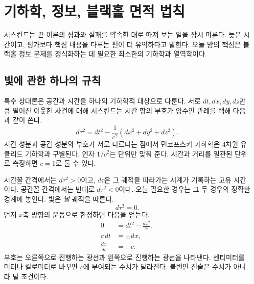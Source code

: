\chapter{기하학, 정보, 블랙홀 면적 법칙}


서스킨드는 끈 이론의 성과와 실패를 약속한 대로 따져 보는 일을 잠시 미룬다. 늦은 시간이고, 평가보다 핵심 내용을 다루는 편이 더 유익하다고 말한다. 오늘 밤의 핵심은 블랙홀 정보 문제를 정식화하는 데 필요한 최소한의 기하학과 열역학이다.

\section{빛에 관한 하나의 규칙}

특수 상대론은 공간과 시간을 하나의 기하학적 대상으로 다룬다. 서로 \(dt,dx,dy,dz\)만큼 떨어진 이웃한 사건에 대해 서스킨드는 시간 항의 부호가 양수인 관례를 택해 다음과 같이 쓴다.
\begin{equation}
d\tau^2=dt^2-\frac{1}{c^2}\left(dx^2+dy^2+dz^2\right).
\end{equation}
시간 성분과 공간 성분의 부호가 서로 다르다는 점에서 민코프스키 기하학은 4차원 유클리드 기하학과 구별된다. 인자 \(1/c^2\)는 단위만 맞춰 준다. 시간과 거리를 일관된 단위로 측정하면 \(c=1\)로 둘 수 있다.

시간꼴 간격에서는 \(d\tau^2>0\)이고, \(d\tau\)은 그 궤적을 따라가는 시계가 기록하는 고유 시간이다. 공간꼴 간격에서는 반대로 \(d\tau^2<0\)이다. 오늘 필요한 경우는 그 두 경우의 정확한 경계에 놓인다. 빛은 \emph{널} 궤적을 따른다.
\begin{equation}
d\tau^2=0.
\end{equation}
먼저 \(x\)축 방향의 운동으로 한정하면 다음을 얻는다.
\begin{align}
0&=dt^2-\frac{dx^2}{c^2},\\
c\,dt&=\pm dx,\\
\frac{dx}{dt}&=\pm c.
\end{align}
부호는 오른쪽으로 진행하는 광선과 왼쪽으로 진행하는 광선을 나타낸다. 센티미터를 미터나 킬로미터로 바꾸면 \(c\)에 부여되는 수치가 달라진다. 불변인 진술은 수치가 아니라 널 조건이다.

